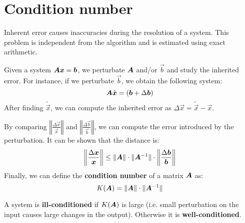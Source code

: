 \section{Condition number}
Inherent error causes inaccuracies during the resolution of a system.
This problem is independent from the algorithm and is estimated using exact arithmetic.

Given a system ${\bm{A}}{\bm{x}} = {\bm{b}}$, we perturbate ${\bm{A}}$ and/or $\vec{b}$ and study the inherited error.
For instance, if we perturbate $\vec{b}$, we obtain the following system:
\[ {\bm{A}}\tilde{{\bm{x}}} = ({\bm{b}} + \Delta{\bm{b}}) \]
After finding $\tilde{\vec{x}}$, we can compute the inherited error as $\Delta\vec{x} = \tilde{\vec{x}} - \vec{x}$.

By comparing $\left\Vert \frac{\Delta\vec{x}}{\vec{x}} \right\Vert$ and $\left\Vert \frac{\Delta\vec{b}}{\vec{b}} \right\Vert$, 
we can compute the error introduced by the perturbation.
It can be shown that the distance is:
\[ 
    \left\Vert \frac{\Delta{\bm{x}}}{{\bm{x}}} \right\Vert \leq 
    \Vert {\bm{A}} \Vert \cdot \Vert {\bm{A}}^{-1} \Vert \cdot \left\Vert \frac{\Delta{\bm{b}}}{{\bm{b}}} \right\Vert 
\]
Finally, we can define the \textbf{condition number} of a matrix ${\bm{A}}$ as: 
\[ K({\bm{A}}) = \Vert {\bm{A}} \Vert \cdot \Vert {\bm{A}}^{-1} \Vert \]

A system is \textbf{ill-conditioned} if $K({\bm{A}})$ is large 
(i.e. small perturbation on the input causes large changes in the output).
Otherwise it is \textbf{well-conditioned}. 